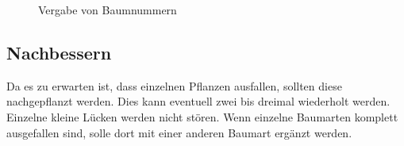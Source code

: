 \documentclass[twocolumn]{scrartcl}
\begin{document}
\begin{figure}[htbp]
  \centering
  \caption{Vergabe von Baumnummern}
  \label{fig:baumnummern}
\end{figure}

\subsection{Nachbessern}

Da es zu erwarten ist, dass einzelnen Pflanzen ausfallen, sollten diese
nachgepflanzt werden. Dies kann eventuell zwei bis dreimal wiederholt werden.
Einzelne kleine Lücken werden nicht stören. Wenn einzelne Baumarten komplett
ausgefallen sind, solle dort mit einer anderen Baumart ergänzt werden.





\end{document}
